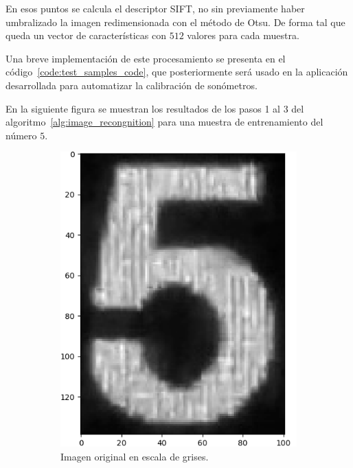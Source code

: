 En esos puntos se calcula el descriptor SIFT, no sin previamente haber umbralizado la imagen redimensionada con el método de Otsu.
De forma tal que queda un vector de características con $512$ valores para cada muestra.

Una breve implementación de este procesamiento se presenta en el código~\ref{code:test_samples_code}, que posteriormente será usado en la aplicación desarrollada para automatizar la calibración de sonómetros.

En la siguiente figura se muestran los resultados de los pasos 1 al 3 del algoritmo~\ref{alg:image_recongnition} para una muestra de entrenamiento del número $5$.
%
\begin{figure}[hb!]
    \caption{Resultados de procesamiento de una muestra de entrenamiento del número $5$.}
    \label{fig:train_sample5_processing}
    \centering
    \begin{subfigure}[t]{0.48\textwidth}
        \centering
        \includegraphics[height=\x1cm]{3_Reconocimiento/Figs/train_sample5_original}
        \caption{Imagen original en escala de grises.}
    \end{subfigure}
    \hfill
    \begin{subfigure}[t]{0.48\textwidth}
        \centering

\end{subfigure}
\end{figure}
